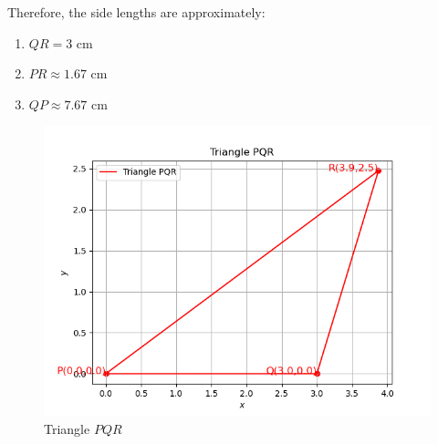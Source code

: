\documentclass[journal]{IEEEtran}
\begin{document}
 Therefore, the side lengths are approximately:
   \begin{enumerate}
       
       \item $QR = 3$ cm
       \item $PR \approx 1.67$ cm
       \item $QP \approx 7.67$ cm
   \end{enumerate}
\begin{figure}[h!]
   \centering
   \includegraphics[width=0.7\linewidth]{figs/triangle_pqr_plot.png}
   \caption{Triangle $PQR$}
\end{figure}
\end{document}
